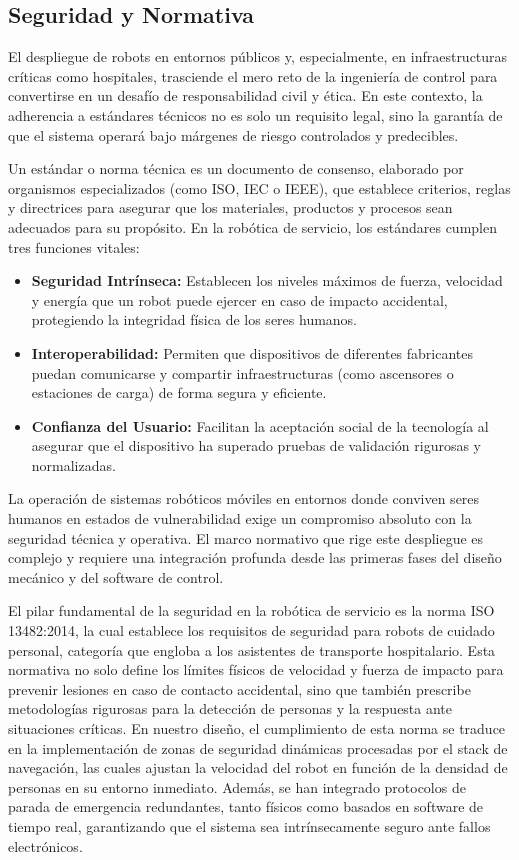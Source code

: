 \subsection{Seguridad y Normativa}
El despliegue de robots en entornos públicos y, especialmente, en infraestructuras críticas como hospitales, trasciende el mero reto de la ingeniería de control para convertirse en un desafío de responsabilidad civil y ética. En este contexto, la adherencia a estándares técnicos no es solo un requisito legal, sino la garantía de que el sistema operará bajo márgenes de riesgo controlados y predecibles.

Un estándar o norma técnica es un documento de consenso, elaborado por organismos especializados (como ISO, IEC o IEEE), que establece criterios, reglas y directrices para asegurar que los materiales, productos y procesos sean adecuados para su propósito. En la robótica de servicio, los estándares cumplen tres funciones vitales:
\begin{itemize}
    \item \textbf{Seguridad Intrínseca:} Establecen los niveles máximos de fuerza, velocidad y energía que un robot puede ejercer en caso de impacto accidental, protegiendo la integridad física de los seres humanos.
    \item \textbf{Interoperabilidad:} Permiten que dispositivos de diferentes fabricantes puedan comunicarse y compartir infraestructuras (como ascensores o estaciones de carga) de forma segura y eficiente.
    \item \textbf{Confianza del Usuario:} Facilitan la aceptación social de la tecnología al asegurar que el dispositivo ha superado pruebas de validación rigurosas y normalizadas.
\end{itemize}

La operación de sistemas robóticos móviles en entornos donde conviven seres humanos en estados de vulnerabilidad exige un compromiso absoluto con la seguridad técnica y operativa. El marco normativo que rige este despliegue es complejo y requiere una integración profunda desde las primeras fases del diseño mecánico y del software de control.

El pilar fundamental de la seguridad en la robótica de servicio es la norma ISO 13482:2014, la cual establece los requisitos de seguridad para robots de cuidado personal, categoría que engloba a los asistentes de transporte hospitalario. Esta normativa no solo define los límites físicos de velocidad y fuerza de impacto para prevenir lesiones en caso de contacto accidental, sino que también prescribe metodologías rigurosas para la detección de personas y la respuesta ante situaciones críticas. En nuestro diseño, el cumplimiento de esta norma se traduce en la implementación de zonas de seguridad dinámicas procesadas por el stack de navegación, las cuales ajustan la velocidad del robot en función de la densidad de personas en su entorno inmediato. Además, se han integrado protocolos de parada de emergencia redundantes, tanto físicos como basados en software de tiempo real, garantizando que el sistema sea intrínsecamente seguro ante fallos electrónicos.

